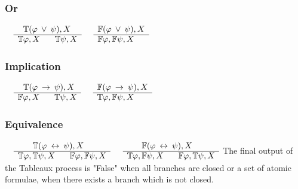 \documentclass{article}
\begin{document}
		\subsubsection*{Or}
			$\begin{array}{rl}
				& \:\:\: \mathbb{T}(\varphi \: \vee \: \psi), X \\
			      \cline{2-2}
			      & \mathbb{T}\varphi, X \:\:\:\:\:\:\:\: \mathbb{T}\psi, X
			\end{array}$
			\:\:\:\:\:\:\:\:\:\:\:\:\:\:\:\:\:\:\:\:\:\:\:\:\:\:\:\:\:\:\:\:
			$\begin{array}{rl}
				& \mathbb{F}(\varphi \: \vee \: \psi), X \\
			      \cline{2-2}
			      & \mathbb{F}\varphi, \mathbb{F}\psi, X
			\end{array}$

		\subsubsection*{Implication}
			$\begin{array}{rl}
				& \:\:\: \mathbb{T}(\varphi \: \rightarrow \: \psi), X \\
			      \cline{2-2}
			      & \mathbb{F}\varphi, X \:\:\:\:\:\:\:\: \mathbb{T}\psi, X
			\end{array}$
			\:\:\:\:\:\:\:\:\:\:\:\:\:\:\:\:\:\:\:\:\:\:\:\:\:\:\:\:\:\:\:\:\:\:
			$\begin{array}{rl}
				& \mathbb{F}(\varphi \: \rightarrow \: \psi), X \\
			      \cline{2-2}
			      & \mathbb{T}\varphi, \mathbb{F}\psi, X
			\end{array}$

		\subsubsection*{Equivalence}
			$\begin{array}{rl}
				& \:\:\:\:\:\:\:\: \mathbb{T}(\varphi \: \leftrightarrow \: \psi), X \\
			      \cline{2-2}
			      & \mathbb{T}\varphi, \mathbb{T}\psi, X \:\:\:\:\:\:\:\: \mathbb{F}\varphi, \mathbb{F}\psi, X
			\end{array}$
			\:\:\:\:\:\:\:\:\:\:
			$\begin{array}{rl}
				& \:\:\:\:\:\:\:\: \mathbb{F}(\varphi \: \leftrightarrow \: \psi), X \\
			      \cline{2-2}
			      & \mathbb{T}\varphi, \mathbb{F}\psi, X \:\:\:\:\:\:\:\: \mathbb{F}\varphi, \mathbb{T}\psi, X
			\end{array}$
		\newline
		\newline
		\newline
		The final output of the Tableaux process is "False" when all branches are closed or a set of atomic formulae, when there exists a branch which is not closed.
		\newline
	
\end{document}
